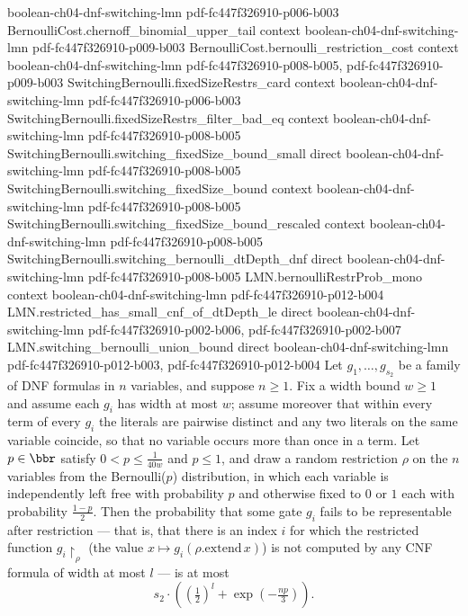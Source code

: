 \begin{theorem}
  {boolean-ch04-dnf-switching-lmn}
  {pdf-fc447f326910-p006-b003}
\proofstep
  {BernoulliCost.chernoff_binomial_upper_tail}
  {context}
  {boolean-ch04-dnf-switching-lmn}
  {pdf-fc447f326910-p009-b003}
\proofstep
  {BernoulliCost.bernoulli_restriction_cost}
  {context}
  {boolean-ch04-dnf-switching-lmn}
  {pdf-fc447f326910-p008-b005,
    pdf-fc447f326910-p009-b003}
\proofstep
  {SwitchingBernoulli.fixedSizeRestrs_card}
  {context}
  {boolean-ch04-dnf-switching-lmn}
  {pdf-fc447f326910-p006-b003}
\proofstep
  {SwitchingBernoulli.fixedSizeRestrs_filter_bad_eq}
  {context}
  {boolean-ch04-dnf-switching-lmn}
  {pdf-fc447f326910-p008-b005}
\proofstep
  {SwitchingBernoulli.switching_fixedSize_bound_small}
  {direct}
  {boolean-ch04-dnf-switching-lmn}
  {pdf-fc447f326910-p008-b005}
\proofstep
  {SwitchingBernoulli.switching_fixedSize_bound}
  {context}
  {boolean-ch04-dnf-switching-lmn}
  {pdf-fc447f326910-p008-b005}
\proofstep
  {SwitchingBernoulli.switching_fixedSize_bound_rescaled}
  {context}
  {boolean-ch04-dnf-switching-lmn}
  {pdf-fc447f326910-p008-b005}
\proofstep
  {SwitchingBernoulli.switching_bernoulli_dtDepth_dnf}
  {direct}
  {boolean-ch04-dnf-switching-lmn}
  {pdf-fc447f326910-p008-b005}
\proofstep
  {LMN.bernoulliRestrProb_mono}
  {context}
  {boolean-ch04-dnf-switching-lmn}
  {pdf-fc447f326910-p012-b004}
\proofstep
  {LMN.restricted_has_small_cnf_of_dtDepth_le}
  {direct}
  {boolean-ch04-dnf-switching-lmn}
  {pdf-fc447f326910-p002-b006,
    pdf-fc447f326910-p002-b007}
\proofstep
  {LMN.switching_bernoulli_union_bound}
  {direct}
  {boolean-ch04-dnf-switching-lmn}
  {pdf-fc447f326910-p012-b003,
    pdf-fc447f326910-p012-b004}
Let $g_1,\dots,g_{s_2}$ be a family of DNF formulas in $n$ variables, and suppose $n \ge
1$. Fix a width bound $w \ge 1$ and assume each $g_i$ has width at most $w$; assume
moreover that within every term of every $g_i$ the literals are pairwise distinct and
any two literals on the same variable coincide, so that no variable occurs more than
once in a term. Let $p \in \bbr$ satisfy $0 < p \le \frac{1}{40w}$ and $p \le 1$, and
draw a random restriction $\rho$ on the $n$ variables from the Bernoulli($p$)
distribution, in which each variable is independently left free with probability $p$ and
otherwise fixed to $0$ or $1$ each with probability $\frac{1-p}{2}$. Then the
probability that some gate $g_i$ fails to be representable after restriction — that is,
that there is an index $i$ for which the restricted function $g_i\!\restriction_\rho$
(the value $x \mapsto g_i(\rho.\mathrm{extend}\,x)$) is not computed by any CNF formula
of width at most $l$ — is at most
\[
s_2 \cdot \left( \left(\tfrac{1}{2}\right)^{l} + \exp\!\left(-\tfrac{n p}{3}\right)
\right).
\]
\end{theorem}

